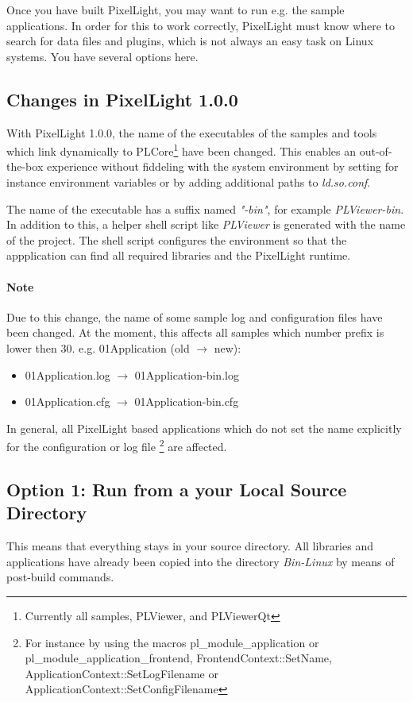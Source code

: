 Once you have built PixelLight, you may want to run e.g. the sample applications. In order for this to work correctly, PixelLight must know where to search for data files and plugins, which is not always an easy task on Linux systems. You have several options here.



\subsection{Changes in PixelLight 1.0.0}
With PixelLight 1.0.0, the name of the executables of the samples and tools which link dynamically to PLCore\footnote{Currently all samples, PLViewer, and PLViewerQt} have been changed. This enables an out-of-the-box experience without fiddeling with the system environment by setting for instance environment variables or by adding additional paths to \emph{ld.so.conf}.

The name of the executable has a suffix named \emph{"-bin"}, for example \emph{PLViewer-bin}. In addition to this, a helper shell script like \emph{PLViewer} is generated with the name of the project. The shell script configures the environment so that the appplication can find all required libraries and the PixelLight runtime.


\paragraph{Note}
Due to this change, the name of some sample log and configuration files have been changed. At the moment, this affects all samples which number prefix is lower then 30. e.g. 01Application (old $\to$ new):
\begin{itemize}
	\item 01Application.log $\to$ 01Application-bin.log
	\item 01Application.cfg $\to$ 01Application-bin.cfg
\end{itemize}
In general, all PixelLight based applications which do not set the name explicitly for the configuration or log file \footnote{For instance by using the macros pl\_module\_application or pl\_module\_application\_frontend, FrontendContext::SetName, ApplicationContext::SetLogFilename or ApplicationContext::SetConfigFilename} are affected.



\subsection{Option 1: Run from a your Local Source Directory}
This means that everything stays in your source directory. All libraries and applications have already been copied into the directory \emph{Bin-Linux} by means of post-build commands.

